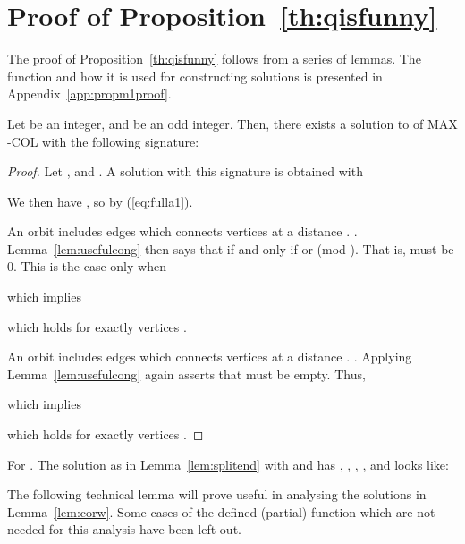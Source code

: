 \documentclass[11pt,a4paper]{article}
\begin{document}
\section{Proof of Proposition~\ref{th:qisfunny}}

The proof of Proposition~\ref{th:qisfunny} follows from a series of lemmas.
The function  and how it is used for constructing solutions is
presented in Appendix~\ref{app:propm1proof}.

\begin{lemma}
\label{lem:splitend}
Let  be an integer, and  be an odd integer. Then, there exists a solution  to  of MAX -COL with the following signature:

\end{lemma}
\begin{proof}
Let  ,  and . A solution  with this signature is obtained with

We then have , so  by (\ref{eq:fulla1}).

An orbit  includes edges which connects vertices at a distance . . 
Lemma~\ref{lem:usefulcong} then says that 
if and only if  or  (mod ).
That is,  must be 0.
This is the case only when

which implies

which holds for exactly  vertices .

An orbit  includes edges which connects vertices at a distance . . Applying Lemma~\ref{lem:usefulcong} again asserts that  must be empty. Thus,

which implies

which holds for exactly  vertices .
\end{proof} 

\begin{exmp}
For . The solution  as in Lemma~\ref{lem:splitend} with  and  has , , , ,  and looks like:

\end{exmp}

The following technical lemma will prove useful in analysing the solutions
in Lemma~\ref{lem:corw}.
Some cases of the defined (partial) function  which are not needed 
for this analysis have been left out.
\end{document}
